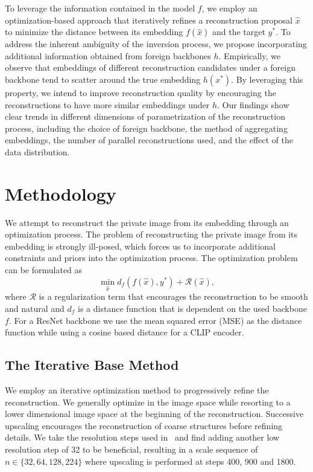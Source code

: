 \documentclass[10pt,twocolumn]{article}
\begin{document}
To leverage the information contained in the model $f$, we employ an optimization-based approach that iteratively refines a reconstruction proposal $\hat{x}$ to minimize the distance between its embedding $f(\hat{x})$ and the target $y^*$.
To address the inherent ambiguity of the inversion process, we propose incorporating additional information obtained from foreign backbones $h$.
Empirically, we observe that embeddings of different reconstruction candidates under a foreign backbone tend to scatter around the true embedding $h(x^*)$.
By leveraging this property, we intend to improve reconstruction quality by encouraging the reconstructions to have more similar embeddings under $h$.
Our findings show clear trends in different dimensions of parametrization of the reconstruction process, including the choice of foreign backbone, the method of aggregating embeddings, the number of parallel reconstructions used, and the effect of the data distribution.

\section{Methodology}
We attempt to reconstruct the private image from its embedding through an optimization process.
The problem of reconstructing the private image from its embedding is strongly ill-posed, which forces us to incorporate additional constraints and priors into the optimization process.
The optimization problem can be formulated as
\begin{equation}
\min_{\hat{x}} d_f(f(\hat{x}), y^*) + \mathcal{R}(\hat{x}),
\end{equation}
where $\mathcal{R}$ is a regularization term that encourages the reconstruction to be smooth and natural and $d_f$ is a distance function that is dependent on the used backbone $f$.
For a ResNet backbone we use the mean squared error (MSE) as the distance function while using a cosine based distance for a CLIP encoder.
\subsection{The Iterative Base Method}\label{base_method}
We employ an iterative optimization method to progressively refine the reconstruction.
We generally optimize in the image space while resorting to a lower dimensional image space at the beginning of the reconstruction.
Successive upscaling encourages the reconstruction of coarse structures before refining details.
We take the resolution steps used in~\cite{kazemiWhatWeLearn2024} and find adding another low resolution step of 32 to be beneficial, resulting in a scale sequence of $n\in\{32, 64, 128, 224\}$ where upscaling is performed at steps 400, 900 and 1800.
\end{document}
